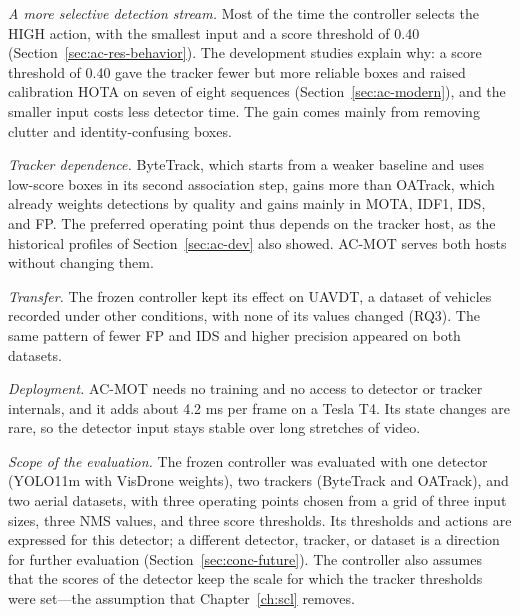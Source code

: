 \emph{A more selective detection stream.} Most of the time the controller selects the HIGH action, with the smallest input and a score threshold of 0.40 (Section~\ref{sec:ac-res-behavior}). The development studies explain why: a score threshold of 0.40 gave the tracker fewer but more reliable boxes and raised calibration HOTA on seven of eight sequences (Section~\ref{sec:ac-modern}), and the smaller input costs less detector time. The gain comes mainly from removing clutter and identity-confusing boxes.

\emph{Tracker dependence.} ByteTrack, which starts from a weaker baseline and uses low-score boxes in its second association step, gains more than OATrack, which already weights detections by quality and gains mainly in MOTA, IDF1, IDS, and FP. The preferred operating point thus depends on the tracker host, as the historical profiles of Section~\ref{sec:ac-dev} also showed. AC-MOT serves both hosts without changing them.

\emph{Transfer.} The frozen controller kept its effect on UAVDT, a dataset of vehicles recorded under other conditions, with none of its values changed (RQ3). The same pattern of fewer FP and IDS and higher precision appeared on both datasets.

\emph{Deployment.} AC-MOT needs no training and no access to detector or tracker internals, and it adds about 4.2 ms per frame on a Tesla T4. Its state changes are rare, so the detector input stays stable over long stretches of video.

\emph{Scope of the evaluation.} The frozen controller was evaluated with one detector (YOLO11m with VisDrone weights), two trackers (ByteTrack and OATrack), and two aerial datasets, with three operating points chosen from a grid of three input sizes, three NMS values, and three score thresholds. Its thresholds and actions are expressed for this detector; a different detector, tracker, or dataset is a direction for further evaluation (Section~\ref{sec:conc-future}). The controller also assumes that the scores of the detector keep the scale for which the tracker thresholds were set---the assumption that Chapter~\ref{ch:scl} removes.

